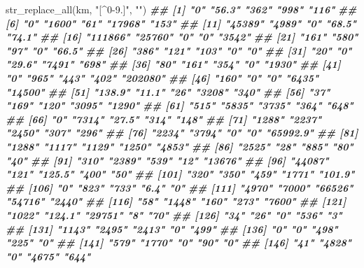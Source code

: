 \documentclass[
  ngerman,
]{article}
\newenvironment{Shaded}{\begin{snugshade}}{\end{snugshade}}
\newcommand{\DocumentationTok}[1]{\textcolor[rgb]{0.56,0.35,0.01}{\textbf{\textit{#1}}}}
\newcommand{\FunctionTok}[1]{\textcolor[rgb]{0.00,0.00,0.00}{#1}}
\newcommand{\NormalTok}[1]{#1}
\newcommand{\StringTok}[1]{\textcolor[rgb]{0.31,0.60,0.02}{#1}}
\begin{document}
\begin{Shaded}
\begin{Highlighting}[]
\FunctionTok{str\_replace\_all}\NormalTok{(km, }\StringTok{"[\^{}0{-}9.]"}\NormalTok{, }\StringTok{""}\NormalTok{)}
\DocumentationTok{\#\#   [1] "0"       "56.3"    "362"     "998"     "116"    }
\DocumentationTok{\#\#   [6] "0"       "1600"    "61"      "17968"   "153"    }
\DocumentationTok{\#\#  [11] "45389"   "4989"    "0"       "68.5"    "74.1"   }
\DocumentationTok{\#\#  [16] "111866"  "25760"   "0"       "0"       "3542"   }
\DocumentationTok{\#\#  [21] "161"     "580"     "97"      "0"       "66.5"   }
\DocumentationTok{\#\#  [26] "386"     "121"     "103"     "0"       "0"      }
\DocumentationTok{\#\#  [31] "20"      "0"       "29.6"    "7491"    "698"    }
\DocumentationTok{\#\#  [36] "80"      "161"     "354"     "0"       "1930"   }
\DocumentationTok{\#\#  [41] "0"       "965"     "443"     "402"     "202080" }
\DocumentationTok{\#\#  [46] "160"     "0"       "0"       "6435"    "14500"  }
\DocumentationTok{\#\#  [51] "138.9"   "11.1"    "26"      "3208"    "340"    }
\DocumentationTok{\#\#  [56] "37"      "169"     "120"     "3095"    "1290"   }
\DocumentationTok{\#\#  [61] "515"     "5835"    "3735"    "364"     "648"    }
\DocumentationTok{\#\#  [66] "0"       "7314"    "27.5"    "314"     "148"    }
\DocumentationTok{\#\#  [71] "1288"    "2237"    "2450"    "307"     "296"    }
\DocumentationTok{\#\#  [76] "2234"    "3794"    "0"       "0"       "65992.9"}
\DocumentationTok{\#\#  [81] "1288"    "1117"    "1129"    "1250"    "4853"   }
\DocumentationTok{\#\#  [86] "2525"    "28"      "885"     "80"      "40"     }
\DocumentationTok{\#\#  [91] "310"     "2389"    "539"     "12"      "13676"  }
\DocumentationTok{\#\#  [96] "44087"   "121"     "125.5"   "400"     "50"     }
\DocumentationTok{\#\# [101] "320"     "350"     "459"     "1771"    "101.9"  }
\DocumentationTok{\#\# [106] "0"       "823"     "733"     "6.4"     "0"      }
\DocumentationTok{\#\# [111] "4970"    "7000"    "66526"   "54716"   "2440"   }
\DocumentationTok{\#\# [116] "58"      "1448"    "160"     "273"     "7600"   }
\DocumentationTok{\#\# [121] "1022"    "124.1"   "29751"   "8"       "70"     }
\DocumentationTok{\#\# [126] "34"      "26"      "0"       "536"     "3"      }
\DocumentationTok{\#\# [131] "1143"    "2495"    "2413"    "0"       "499"    }
\DocumentationTok{\#\# [136] "0"       "0"       "498"     "225"     "0"      }
\DocumentationTok{\#\# [141] "579"     "1770"    "0"       "90"      "0"      }
\DocumentationTok{\#\# [146] "41"      "4828"    "0"       "4675"    "644"    }

\end{Highlighting}
\end{Shaded}
\end{document}
